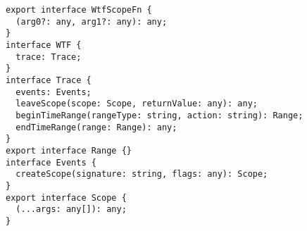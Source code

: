 \begin{verbatim}
export interface WtfScopeFn {
  (arg0?: any, arg1?: any): any;
}
interface WTF {
  trace: Trace;
}
interface Trace {
  events: Events;
  leaveScope(scope: Scope, returnValue: any): any;
  beginTimeRange(rangeType: string, action: string): Range;
  endTimeRange(range: Range): any;
}
export interface Range {}
interface Events {
  createScope(signature: string, flags: any): Scope;
}
export interface Scope {
  (...args: any[]): any;
}
\end{verbatim}
